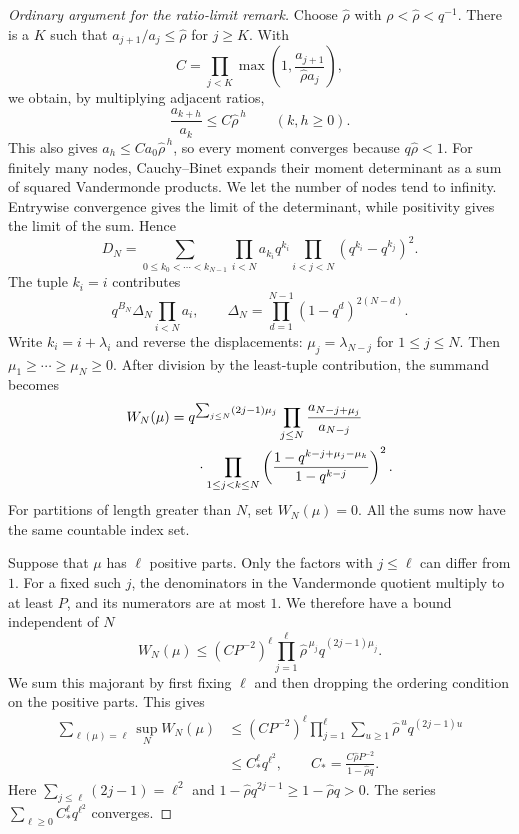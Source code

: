 \begin{proof}[Ordinary argument for the ratio-limit remark]
Choose $\widehat\rho$ with $\rho<\widehat\rho<q^{-1}$.
There is a $K$ such that $a_{j+1}/a_j\le\widehat\rho$ for $j\ge K$.
With
\[
 C=\prod_{j<K}\max\left(1,\frac{a_{j+1}}{\widehat\rho a_j}\right),
\]
we obtain, by multiplying adjacent ratios,
\begin{equation}\label{long1049:eq:ratio-shift-bound}
 \frac{a_{k+h}}{a_k}\le C\widehat\rho^{\,h}\qquad(k,h\ge0).
\end{equation}
This also gives $a_h\le Ca_0\widehat\rho^{\,h}$, so every moment
converges because $q\widehat\rho<1$.
For finitely many nodes,
Cauchy--Binet expands their moment determinant as a sum of squared
Vandermonde products. We let the number of nodes tend to infinity.
Entrywise convergence gives the limit of the determinant, while
positivity gives the limit of the sum. Hence
\begin{equation}\label{long1049:eq:ratio-heine}
 D_N=\sum_{0\le k_0<\cdots<k_{N-1}}
 \prod_{i<N}a_{k_i}q^{k_i}
 \prod_{i<j<N}(q^{k_i}-q^{k_j})^2.
\end{equation}
The tuple $k_i=i$ contributes
\[
 q^{B_N}\Delta_N\prod_{i<N}a_i,\qquad
 \Delta_N=\prod_{d=1}^{N-1}(1-q^d)^{2(N-d)}.
\]
Write $k_i=i+\lambda_i$ and reverse the displacements:
$\mu_j=\lambda_{N-j}$ for $1\le j\le N$. Then
$\mu_1\ge\cdots\ge\mu_N\ge0$. After division by the least-tuple
contribution, the summand becomes
\begin{equation}\label{long1049:eq:ratio-partition}
\begin{split}
 W_N(\mu)={}&q^{\sum_{j\le N}(2j-1)\mu_j}
 \prod_{j\le N}\frac{a_{N-j+\mu_j}}{a_{N-j}}\\
 &\hspace{2mm}\cdot\prod_{1\le j<k\le N}
 \left(\frac{1-q^{k-j+\mu_j-\mu_k}}{1-q^{k-j}}\right)^2.
\end{split}
\end{equation}
For partitions of length greater than $N$, set $W_N(\mu)=0$.
All the sums now have the same countable index set.

Suppose that $\mu$ has $\ell$ positive parts. Only the factors with
$j\le\ell$ can differ from $1$. For a fixed such $j$, the denominators
in the Vandermonde quotient multiply to at least $P$, and its
numerators are at most $1$. We therefore have a bound independent
of $N$
\[
 W_N(\mu)\le (CP^{-2})^\ell
 \prod_{j=1}^{\ell}\widehat\rho^{\,\mu_j}q^{(2j-1)\mu_j}.
\]
We sum this majorant by first fixing $\ell$ and then dropping the
ordering condition on the positive parts. This gives
\begin{align*}
 \sum_{\ell(\mu)=\ell}\sup_N W_N(\mu)
 &\le(CP^{-2})^\ell\prod_{j=1}^{\ell}
        \sum_{u\ge1}\widehat\rho^{\,u} q^{(2j-1)u}\\
 &\le C_*^{\ell}q^{\ell^2},\qquad
 C_*=\frac{C\widehat\rho P^{-2}}{1-\widehat\rho q}.
\end{align*}
Here $\sum_{j\le\ell}(2j-1)=\ell^2$ and
$1-\widehat\rho q^{2j-1}\ge1-\widehat\rho q>0$.
The series $\sum_{\ell\ge0}C_*^{\ell}q^{\ell^2}$ converges.


\end{proof}
